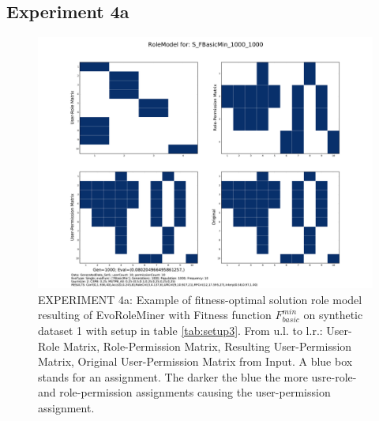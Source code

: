 \subsection{Experiment 4a}
\label{sec:experiment4a}
    \begin{figure}[H]
    	\centering
    	\includegraphics[scale=0.37, trim=4cm 2cm 4cm 2cm, clip=true]{./Figures/exp4aBasic_RM}
    	\caption{EXPERIMENT 4a: Example of fitness-optimal solution role model resulting of EvoRoleMiner with Fitness function $F_{basic}^{min}$ on synthetic dataset 1 with setup in table \ref{tab:setup3}. From u.l. to l.r.: User-Role Matrix, Role-Permission Matrix, Resulting User-Permission Matrix, Original User-Permission Matrix from Input. A blue box stands for an assignment. The darker the blue the more usre-role- and role-permission assignments causing the user-permission assignment.}
    	\label{fig:exp4aBasic_RM}
    \end{figure}

